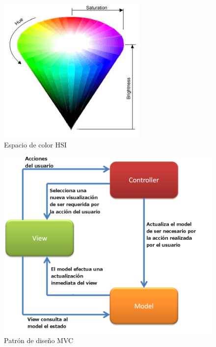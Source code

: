 \begin{figure}
	\includegraphics[width=0.4\linewidth]{images/hsb}
	\caption{Espacio de color HSI} \label{fig:hsb}
\end{figure}
\begin{figure}
	\includegraphics[width=1\linewidth]{images/mvcbase}
	\caption{Patrón de diseño MVC} \label{fig:mvc}
\end{figure}


